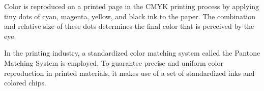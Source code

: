 \documentclass{report}
\begin{document}
    \bigbreak \noindent \bigbreak \noindent 
    \bigbreak \noindent 
    Color is reproduced on a printed page in the CMYK printing process by applying tiny dots of cyan, magenta, yellow, and black ink to the paper. The combination and relative size of these dots determines the final color that is perceived by the eye.

    \bigbreak \noindent \bigbreak \noindent 
    \bigbreak \noindent 
    In the printing industry, a standardized color matching system called the Pantone Matching System is employed. To guarantee precise and uniform color reproduction in printed materials, it makes use of a set of standardized inks and colored chips.
\end{document}
